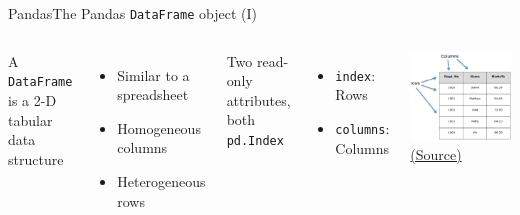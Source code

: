 \documentclass[10pt,compress]{beamer} %
\begin{document}
\begin{frame}{Pandas}{The Pandas \texttt{DataFrame} object (I)}
	\begin{columns}
		A \texttt{DataFrame} is a 2-D tabular data structure
		\begin{itemize}
			\item Similar to a spreadsheet
			\item Homogeneous columns
			\item Heterogeneous rows
		\end{itemize}
		Two read-only attributes, both \texttt{pd.Index}
		\begin{itemize}
			\item \texttt{index}: Rows
			\item \texttt{columns}: Columns
		\end{itemize}

		\centering \includegraphics[width=\textwidth]{figs/structure_table.jpg}\\
		\tiny \href{https://www.tutorialspoint.com/python\_pandas/python\_pandas\_dataframe.htm}{(Source)}
	\end{columns}
\end{frame}
\end{document}
